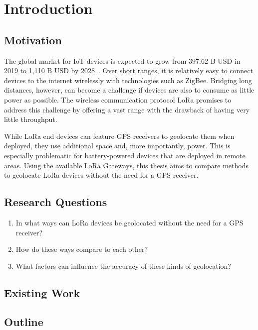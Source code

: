 \chapter{Introduction}

\section{Motivation}

The global market for IoT devices is expected to grow from 397.62 B USD in 2019 to 1,110 B USD by 2028~\cite{grand_view_research_global_2022}.
Over short ranges, it is relatively easy to connect devices to the internet wirelessly with technologies such as ZigBee.
Bridging long distances, however, can become a challenge if devices are also to consume as little power as possible.
The wireless communication protocol \ac{LoRa} promises to address this challenge by offering a vast range with the drawback of having very little throughput.

While \ac{LoRa} end devices can feature \ac{GPS} receivers to geolocate them when deployed, they use additional space and, more importantly, power.
This is especially problematic for battery-powered devices that are deployed in remote areas.
Using the available \ac{LoRa} Gateways, this thesis aims to compare methods to geolocate \ac{LoRa} devices without the need for a GPS receiver.

\section{Research Questions}

\begin{enumerate}
    \item In what ways can \ac{LoRa} devices be geolocated without the need for a GPS receiver?
    \item How do these ways compare to each other?
    \item What factors can influence the accuracy of these kinds of geolocation?
\end{enumerate}

\section{Existing Work}

\section{Outline}